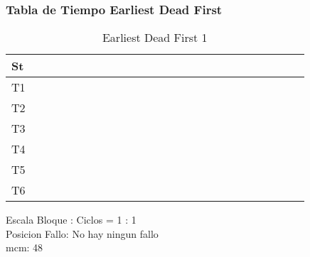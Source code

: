 \documentclass[xcolor=table]{beamer}
\begin{document}
\begin{frame} 
\frametitle{Tabla de Tiempo  Earliest Dead First } 
\begin{table} 
\centering 
\begin{tabular}{|l|l|l|l|l|l|l|l|l|l|l|l|l|l|l|l|l|l|l|l|l|l|l|l|l|} 
\hline 
St & \cellcolor{green} & \cellcolor{green} & \cellcolor{green} & \cellcolor{green} & \cellcolor{green} & \cellcolor{green} & \cellcolor{green} & \cellcolor{green} & \cellcolor{green} & \cellcolor{green} & \cellcolor{green} & \cellcolor{green} & \cellcolor{green} & \cellcolor{green} & \cellcolor{green} & \cellcolor{green} & \cellcolor{green} & \cellcolor{green} & \cellcolor{green} & \cellcolor{green} & \cellcolor{green} & \cellcolor{green} & \cellcolor{green} & \cellcolor{green} \\ \hline 
T1 & & & & & & \cellcolor{blue} & & & & & & & & & & & & & & & & & & \\ \hline 
T2 & & & & & \cellcolor{purple} & & & & & & & & & & & & & & & & & & & \\ \hline 
T3 & & & & \cellcolor{cyan} & & & & & & & & & & & & & & & & & & & & \\ \hline 
T4 & & & \cellcolor{gray} & & & & & & & & & & & & & & & & & & & & & \\ \hline 
T5 & & \cellcolor{yellow} & & & & & & & & & & & & & & & & & & & & & & \\ \hline 
T6 & \cellcolor{orange} & & & & & & & & & & & & & & & & & & & & & & & \\ \hline 
\end{tabular} 
\caption{ Earliest Dead First 1 } 
\end{table} 
Escala Bloque : Ciclos = 1 : 1 \\ 
Posicion Fallo: No hay ningun fallo \\ 
mcm:  48 \\ 
\end{frame} 

\end{document}
